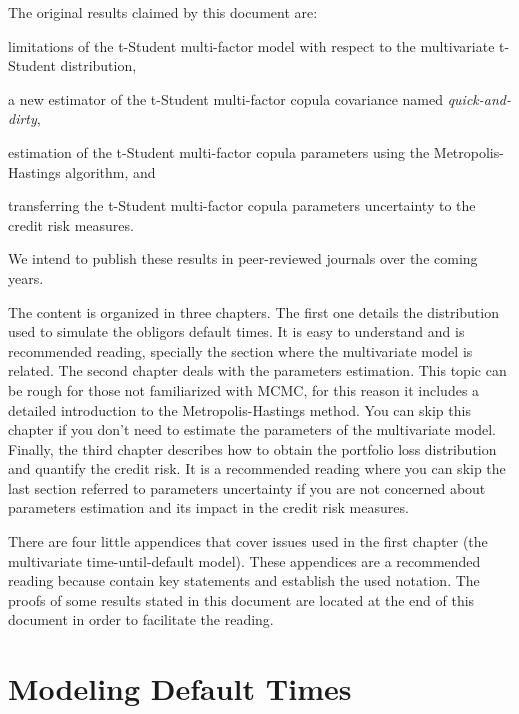 \documentclass[11pt,fleqn]{book} %
\begin{document}
The original results claimed by this document are: 
\begin{inparaenum}[1)]
	\item limitations of the t-Student multi-factor model with respect to 
	the multivariate t-Student distribution,
	\item a new estimator of the t-Student multi-factor copula covariance named 
	\emph{quick-and-dirty},
	\item estimation of the t-Student multi-factor copula parameters using the 
	Metropolis-Hastings algorithm, and
	\item transferring the t-Student multi-factor copula parameters uncertainty 
	to the credit risk measures.
\end{inparaenum}
We intend to publish these results in peer-reviewed journals over the coming years.

The content is organized in three chapters. The first one details the 
distribution used to simulate the obligors default times. It is easy to 
understand and is recommended reading, specially the section where the 
multivariate model is related. The second chapter deals with the parameters 
estimation. This topic can be rough for those not familiarized 
with MCMC, for this reason it includes a detailed introduction to the 
Metropolis-Hastings method. You can skip this chapter if you don't need 
to estimate the parameters of the multivariate model. Finally, the 
third chapter describes how to obtain the portfolio loss distribution and 
quantify the credit risk. It is a recommended reading where you can skip the 
last section referred to parameters uncertainty if you are not concerned about 
parameters estimation and its impact in the credit risk measures.

There are four little appendices that cover issues used in the first chapter 
(the multivariate time-until-default model). These appendices are a recommended 
reading because contain key statements and establish the used notation.
The proofs of some results stated in this document are located at the end of 
this document in order to facilitate the reading.



\chapter{Modeling Default Times}
\label{chap:mdt}
\end{document}
